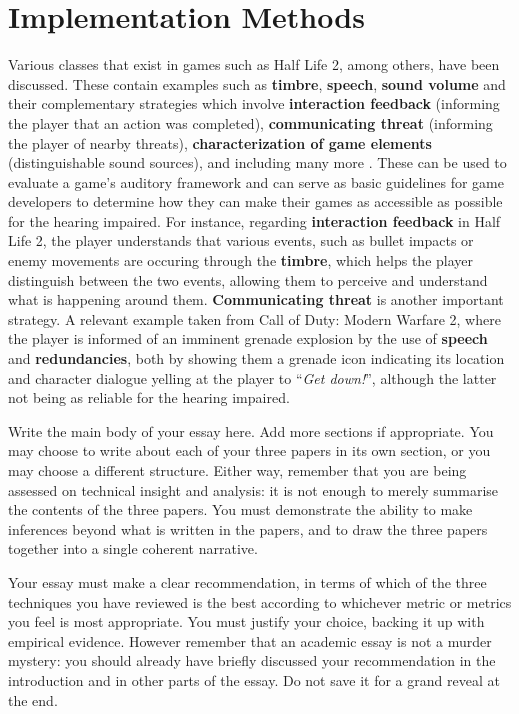 \documentclass{scrartcl}
\begin{document}
\section{Implementation Methods}
Various classes that exist in games such as Half Life 2, among others, have been discussed. These contain examples such as \textbf{timbre}, \textbf{speech}, \textbf{sound volume} and their complementary strategies which involve \textbf{interaction feedback} (informing the player that an action was completed), \textbf{communicating threat} (informing the player of nearby threats), \textbf{characterization of game elements} (distinguishable sound sources), and including many more \cite{Denise}. These can be used to evaluate a game's auditory framework and can serve as basic guidelines for game developers to determine how they can make their games as accessible as possible for the hearing impaired. For instance, regarding \textbf{interaction feedback} in Half Life 2, the player understands that various events, such as bullet impacts or enemy movements are occuring through the \textbf{timbre}, which helps the player distinguish between the two events, allowing them to perceive and understand what is happening around them. \textbf{Communicating threat} is another important strategy. A relevant example taken from Call of Duty: Modern Warfare 2, where the player is informed of an imminent grenade explosion by the use of \textbf{speech} and \textbf{redundancies}, both by showing them a grenade icon indicating its location and character dialogue yelling at the player to  ``\textit{Get down!}'', although the latter not being as reliable for the hearing impaired. \cite{Denise}


Write the main body of your essay here. Add more sections if appropriate. You may choose to write about each of your three papers in its own section, or you may choose a different structure. Either way, remember that you are being assessed on technical insight and analysis: it is not enough to merely summarise the contents of the three papers. You must demonstrate the ability to make inferences beyond what is written in the papers, and to draw the three papers together into a single coherent narrative.

Your essay must make a clear recommendation, in terms of which of the three techniques you have reviewed is the best according to whichever metric or metrics you feel is most appropriate. You must justify your choice, backing it up with empirical evidence. However remember that an academic essay is not a murder mystery: you should already have briefly discussed your recommendation in the introduction and in other parts of the essay. Do not save it for a grand reveal at the end.
\end{document}
